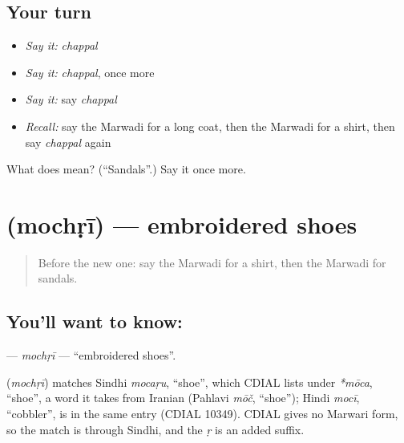\subsection*{Your turn}
\begin{itemize}
\raggedright
  \item \emph{Say it:} \emph{chappal}
  \item \emph{Say it:} \emph{chappal}, once more
  \item \emph{Say it:} say \emph{chappal}
  \item \emph{Recall:} say the Marwadi for a long coat, then the Marwadi for a shirt, then say \emph{chappal} again
\end{itemize}

\begin{tcolorbox}[breakable,colback=teal!4,colframe=teal!35!black,title={Before you move on}]
What does  mean? (\textquotedblleft{}Sandals\textquotedblright{}.) Say it once more.
\end{tcolorbox}
\section[\texorpdfstring{\mw{मोचड़ी} (mochṛī)}{मोचड़ी (mochṛī)}]{ (mochṛī) — embroidered shoes}

\label{lesson:MW-C129-mochri}



\begin{quote}
Before the new one: say the Marwadi for a shirt, then the Marwadi for sandals.
\end{quote}

\subsection*{You'll want to know: }
\textbf{} — \emph{mochṛī} — \textquotedblleft{}embroidered shoes\textquotedblright{}.

\begin{cousinweb}
\textbf{} (\emph{mochṛī}) matches Sindhi \emph{mocaṛu}, \textquotedblleft{}shoe\textquotedblright{}, which CDIAL lists under \emph{*mōca}, \textquotedblleft{}shoe\textquotedblright{}, a word it takes from Iranian (Pahlavi \emph{mōč}, \textquotedblleft{}shoe\textquotedblright{}); Hindi \emph{mocī}, \textquotedblleft{}cobbler\textquotedblright{}, is in the same entry (CDIAL 10349). CDIAL gives no Marwari form, so the match is through Sindhi, and the \emph{ṛ} is an added suffix.
\end{cousinweb}

